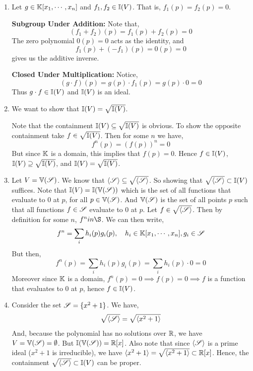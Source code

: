 \documentclass[Notebook.tex]{subfiles}
\begin{document}
\begin{solution}
    \bbni 
    \begin{enumerate}[label=(\alph*),ref=\theenumi\alph*]
        \item Let $g \in \mathbb K[x_1, \cdots, x_n]$ and $f_1, f_2 \in \mathbb I(V)$. That is, $f_1(p) = f_2(p) = 0$. 
        
        \textbf{Subgroup Under Addition:} Note that, \[(f_1 + f_2)(p) = f_1(p) + f_2(p) = 0\] The  zero polynomial $0(p) = 0$ acts as the identity, and \[f_1(p) + (-f_1)(p) = 0(p) = 0\] gives us the additive inverse.  

        \textbf{Closed Under Multiplication:} Notice, 
        \[(g \cdot f)(p) = g(p) \cdot f_1(p) = g(p) \cdot 0 = 0\]
        Thus $g \cdot f \in \mathbb I(V)$ and $\mathbb I(V)$ is an ideal. 

        \item We want to show that $\mathbb I(V) = \sqrt{\mathbb I(V)}$. 

        Note that the containment $\mathbb I(V) \subseteq \sqrt{\mathbb I(V)}$ is obvious. To show the opposite containment take $f \in \sqrt{\mathbb I(V)}$. Then for some $n$ we have, 
        \[f^n(p) = (f(p))^n = 0\]
        But since $\mathbb K$ is a domain, this implies that $f(p) = 0$. Hence $f \in \mathbb I(V)$, $\mathbb I(V) \supseteq \sqrt{\mathbb I(V)}$, and $\mathbb I(V) = \sqrt{\mathbb I(V)}$.

        \item Let $V = \mathbb V(\operatorname{\mathscr S})$. We know that $\langle \operatorname{\mathscr S} \rangle \subseteq \sqrt{\langle \operatorname{\mathscr S} \rangle}$. So showing that $\sqrt{\langle \operatorname{\mathscr S} \rangle} \subset \mathbb I(V)$ suffices. Note that 
        $\mathbb I(V) = \mathbb I(\mathbb V(\operatorname{\mathscr S}))$ which is the set of all functions that evaluate to $0$ at $p$, for all $p \in \mathbb V(\operatorname{\mathscr S})$. And $\mathbb V(\operatorname{\mathscr S})$ is the set of all points $p$ such that all functions $f \in \operatorname{\mathscr S}$ evaluate to $0$ at $p$. Let $f \in \sqrt{\langle \operatorname{\mathscr S} \rangle}$. Then by definition for some $n$, $f^n in \S$. We can then write, 
        \[f^n = \sum_ih_i(p)g_i(p), \quad h_i \in \mathbb K[x_1, \cdots, x_n], g_i \in \operatorname{\mathscr S}\]
        But then, 
        \[f^n(p) = \sum_ih_i(p)g_i(p) = \sum_ih_i(p)\cdot 0 = 0\]
        Moreover since $\mathbb K$ is a domain, $f^n(p) = 0 \implies f(p) = 0 \implies f$ is a function that evaluates to $0$ at $p$, hence $f \in \mathbb I(V)$. 

        \item Consider the set $\operatorname{\mathscr S} = \{x^2+ 1\}$. We have, 
        \[\sqrt{\langle \operatorname{\mathscr S} \rangle} = \sqrt{\langle x^2 + 1 \rangle}\]
        And, because the polynomial has no solutions over $\mathbb R$, we have $V = \mathbb V(\operatorname{\mathscr S}) = \emptyset$. But $\mathbb I(\mathbb V(\operatorname{\mathscr S})) = \mathbb R[x]$. Also note that since $\langle \operatorname{\mathscr S} \rangle$ is a prime ideal ($x^2 +1$ is irreducible), we have $ {\langle x^2 + 1 \rangle} = \sqrt{\langle x^2 + 1 \rangle} \subset \mathbb R[x]$. Hence, the containment $\sqrt{\langle \operatorname{\mathscr S} \rangle} \subset \mathbb I(V)$ can be proper. 


\end{enumerate}
\end{solution}
\end{document}
